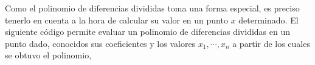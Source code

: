 


    
\begin{paracol}{2}
Como el polinomio de diferencias divididas toma una forma especial, es preciso tenerlo en cuenta a la hora de calcular su valor en un punto $x$ determinado. El siguiente código permite evaluar un polinomio de diferencias divididas en un punto dado, conocidos sus coeficientes y los valores $x_1,\cdots, x_n$ a partir de los cuales se obtuvo el polinomio,
\end{paracol}




